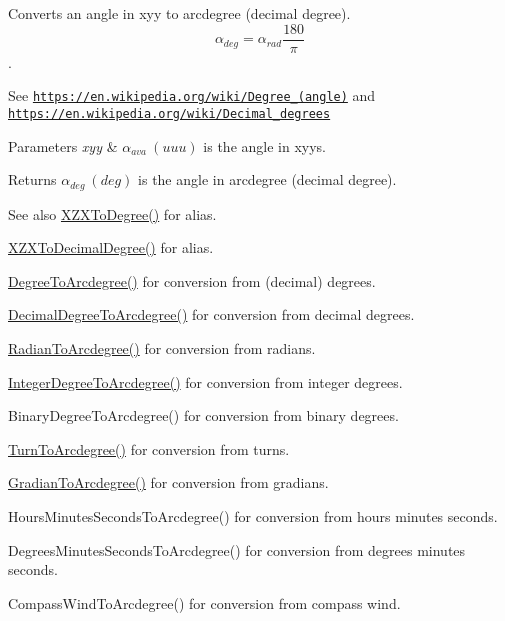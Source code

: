 Converts an angle in xyy to arcdegree (decimal degree). \[\alpha_{deg}=\alpha_{rad}\frac{180}{\pi}\]. 

See \href{https://en.wikipedia.org/wiki/Degree_(angle)}{\tt https\+://en.\+wikipedia.\+org/wiki/\+Degree\+\_\+(angle)} and \href{https://en.wikipedia.org/wiki/Decimal_degrees}{\tt https\+://en.\+wikipedia.\+org/wiki/\+Decimal\+\_\+degrees} 
\begin{DoxyParams}{Parameters}
{\em xyy} & $\alpha_{ava}\ (uuu)$ is the angle in xyys. \\
\hline
\end{DoxyParams}
\begin{DoxyReturn}{Returns}
$\alpha_{deg}\ (deg)$ is the angle in arcdegree (decimal degree). 
\end{DoxyReturn}
\begin{DoxySeeAlso}{See also}
\mbox{\hyperlink{group___e_g_x_math-_angle_conversions-_x_z_x_gaf91d111a3f3558dcd147d3832afc1fd6}{X\+Z\+X\+To\+Degree()}} for alias. 

\mbox{\hyperlink{group___e_g_x_math-_angle_conversions-_x_z_x_ga34889b101a1069ca94a6b899fb98d271}{X\+Z\+X\+To\+Decimal\+Degree()}} for alias. 

\mbox{\hyperlink{group___e_g_x_math-_angle_conversions-_degree_gac1b5f3b68f66c77a6df4ceef842c9b19}{Degree\+To\+Arcdegree()}} for conversion from (decimal) degrees. 

\mbox{\hyperlink{group___e_g_x_math-_angle_conversions-_decimal_degree_gacdd463fcabffeb598ebda65b012ce743}{Decimal\+Degree\+To\+Arcdegree()}} for conversion from decimal degrees. 

\mbox{\hyperlink{group___e_g_x_math-_angle_conversions-_radian_ga3dfdc97357cc07f8379976bbc08f9852}{Radian\+To\+Arcdegree()}} for conversion from radians. 

\mbox{\hyperlink{group___e_g_x_math-_angle_conversions-_integer_degree_gaf633d0b82bfb7586ce86ffbcf78d8f7a}{Integer\+Degree\+To\+Arcdegree()}} for conversion from integer degrees. 

Binary\+Degree\+To\+Arcdegree() for conversion from binary degrees. 

\mbox{\hyperlink{group___e_g_x_math-_angle_conversions-_turn_ga7bdc3a81ce316dd47b1a3179489fa195}{Turn\+To\+Arcdegree()}} for conversion from turns. 

\mbox{\hyperlink{group___e_g_x_math-_angle_conversions-_gradian_gacd0b1797f2460944dcbc541a855ec21c}{Gradian\+To\+Arcdegree()}} for conversion from gradians. 

Hours\+Minutes\+Seconds\+To\+Arcdegree() for conversion from hours minutes seconds. 

Degrees\+Minutes\+Seconds\+To\+Arcdegree() for conversion from degrees minutes seconds. 

Compass\+Wind\+To\+Arcdegree() for conversion from compass wind. 
\end{DoxySeeAlso}
